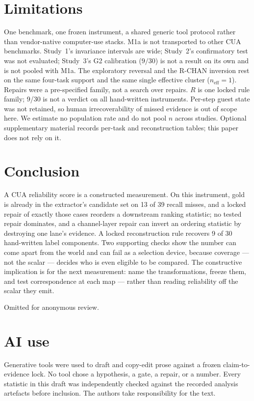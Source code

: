 \documentclass[sigconf,anonymous]{aamas}
\begin{document}
\section{Limitations}
\label{sec:limits}

One benchmark, one frozen instrument, a shared generic tool protocol rather than vendor-native computer-use stacks.
M1a is not transported to other CUA benchmarks.
Study~1's invariance intervals are wide; Study~2's confirmatory test was not evaluated; Study~3's G2 calibration ($9/30$) is not a result on its own and is not pooled with M1a.
The exploratory reversal and the R-CHAN inversion rest on the same four-task support and the same single effective cluster ($n_{\mathrm{eff}}=1$).
Repairs were a pre-specified family, not a search over repairs.
$R$ is one locked rule family; 9/30 is not a verdict on all hand-written instruments.
Per-step guest state was not retained, so human irrecoverability of missed evidence is out of scope here.
We estimate no population rate and do not pool $n$ across studies.
Optional supplementary material records per-task and reconstruction tables; this paper does not rely on it.

\section{Conclusion}
\label{sec:conclusion}

A CUA reliability score is a constructed measurement.
On this instrument, gold is already in the extractor's candidate set on 13 of 39 recall misses, and a locked repair of exactly those cases reorders a downstream ranking statistic; no tested repair dominates, and a channel-layer repair can invert an ordering statistic by destroying one lane's evidence.
A locked reconstruction rule recovers 9 of 30 hand-written label components.
Two supporting checks show the number can come apart from the world and can fail as a selection device, because coverage --- not the scalar --- decides who is even eligible to be compared.
The constructive implication is for the next measurement: name the transformations, freeze them, and test correspondence at each map --- rather than reading reliability off the scalar they emit.

\begin{acks}
Omitted for anonymous review.
\end{acks}

\section*{AI use}
Generative tools were used to draft and copy-edit prose against a frozen claim-to-evidence lock.
No tool chose a hypothesis, a gate, a repair, or a number.
Every statistic in this draft was independently checked against the recorded analysis artefacts before inclusion.
The authors take responsibility for the text.



\end{document}
